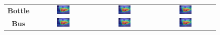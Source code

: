 \begin{figure}[ht]
\begin{tabular}{c c c c}
    \textbf{Bottle}      & \includegraphics[width=0.23\textwidth]{figures/qualitative_analysis/test_cam/2010_005860_6.jpg} & \includegraphics[width=0.23\textwidth]{figures/qualitative_analysis/test_cam/2010_005860_6.jpg} & \includegraphics[width=0.23\textwidth]{figures/qualitative_analysis/test_cam/2010_005860_6.jpg} \\
    \textbf{Bus}         & \includegraphics[width=0.23\textwidth]{figures/qualitative_analysis/test_cam/2010_005860_6.jpg} & \includegraphics[width=0.23\textwidth]{figures/qualitative_analysis/test_cam/2010_005860_6.jpg} & \includegraphics[width=0.23\textwidth]{figures/qualitative_analysis/test_cam/2010_005860_6.jpg} \\

\end{tabular}
\end{figure}
